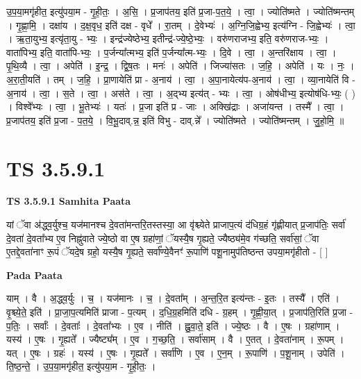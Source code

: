 \documentclass[17pt]{extarticle}
\begin{document}
उ॒प॒या॒मगृ॑हीत॒ इत्यु॑पया॒म - गृ॒ही॒तः॒ । अ॒सि॒ । प्र॒जाप॑तय॒ इति॑ प्र॒जा-प॒त॒ये॒ । त्वा॒ । ज्योति॑ष्मते । ज्योति॑ष्मन्तम् । गृ॒ह्णा॒मि॒ । दक्षा॑य । द॒क्ष॒वृध॒ इति॑ दक्ष - वृधे᳚ । रा॒तम् । दे॒वेभ्यः॑ । अ॒ग्नि॒जि॒ह्वेभ्य॒ इत्य॑ग्नि - जि॒ह्वेभ्यः॑ । त्वा॒ । ऋ॒ता॒युभ्य॒ इत्यृ॑ता॒यु - भ्यः॒ । इन्द्र॑ज्येष्ठेभ्य॒ इतीन्द्र॑-ज्ये॒ष्ठे॒भ्यः॒ । वरु॑णराजभ्य॒ इति॒ वरु॑णराज-भ्यः॒ । वाता॑पिभ्य॒ इति॒ वाता॑पि-भ्यः॒ । प॒र्जन्या᳚त्मभ्य॒ इति॑ प॒र्जन्या᳚त्म-भ्यः॒ । दि॒वे । त्वा॒ । अ॒न्तरि॑क्षाय । त्वा॒ । पृ॒थि॒व्यै । त्वा॒ । अपेति॑ । इ॒न्द्र॒ । द्वि॒ष॒तः । मनः॑ । अपेति॑ । जिज्या॑सतः । ज॒हि॒ । अपेति॑ । यः । नः॒ । अ॒रा॒ती॒यति॑ । तम् । ज॒हि॒ । प्रा॒णायेति॑ प्रा - अ॒नाय॑ । त्वा॒ । अ॒पा॒नायेत्य॑प-अ॒नाय॑ । त्वा॒ । व्या॒नायेति॑ वि - अ॒नाय॑ । त्वा॒ । स॒ते । त्वा॒ । अस॑ते । त्वा॒ । अ॒द्भ्य इत्य॑त् - भ्यः । त्वा॒ । ओष॑धीभ्य॒ इत्योष॑धि-भ्यः॒ ( ) । विश्वे᳚भ्यः । त्वा॒ । भू॒तेभ्यः॑ । यतः॑ । प्र॒जा इति॑ प्र - जाः । अक्खि॑द्राः । अजा॑यन्त । तस्मै᳚ । त्वा॒ । प्र॒जाप॑तय॒ इति॑ प्र॒जा - प॒त॒ये॒ । वि॒भू॒दाव्.न्न॒ इति॑ विभु - दाव्.न्ने᳚ । ज्योति॑ष्मते । ज्योति॑ष्मन्तम् । जु॒हो॒मि॒ ॥  \newline





\section{ TS 3.5.9.1 }

\textbf{TS 3.5.9.1 } \newline
\textbf{Samhita Paata} \newline

यां ॅवा अ॑द्ध्व॒र्युश्च॒ यज॑मानश्च दे॒वता॑मन्तरि॒तस्तस्या॒ आ वृ॑श्च्येते प्राजाप॒त्यं द॑धिग्र॒हं गृ॑ह्णीयात् प्र॒जाप॑तिः॒ सर्वा॑ दे॒वता॑ दे॒वता᳚भ्य ए॒व निह्नु॑वाते ज्ये॒ष्ठो वा ए॒ष ग्रहा॑णां॒ ॅयस्यै॒ष गृ॒ह्यते॒ ज्यैष्ठ्य॑मे॒व ग॑च्छति॒ सर्वा॑सां॒ ॅवा ए॒तद्दे॒वता॑नाꣳ रू॒पं ॅयदे॒ष ग्रहो॒ यस्यै॒ष गृ॒ह्यते॒ सर्वा᳚ण्ये॒वैनꣳ॑ रू॒पाणि॑ पशू॒नामुप॑तिष्ठन्त उपया॒मगृ॑हीतो - [  ] \newline

\textbf{Pada Paata} \newline

याम् । वै । अ॒द्ध्व॒र्युः । च॒ । यज॑मानः । च॒ । दे॒वता᳚म् । अ॒न्त॒रि॒त इत्य॑न्तः - इ॒तः । तस्यै᳚ । एति॑ । वृ॒श्च्ये॒ते॒ इति॑ । प्रा॒जा॒प॒त्यमिति॑ प्राजा - प॒त्यम् । द॒धि॒ग्र॒हमिति॑ दधि - ग्र॒हम् । गृ॒ह्णी॒या॒त् । प्र॒जाप॑ति॒रिति॑ प्र॒जा - प॒तिः॒ । सर्वाः᳚ । दे॒वताः᳚ । दे॒वता᳚भ्यः । ए॒व । नीति॑ । ह्नु॒वा॒ते॒ इति॑ । ज्ये॒ष्ठः । वै । ए॒षः । ग्रहा॑णाम् । यस्य॑ । ए॒षः । गृ॒ह्यते᳚ । ज्यैष्ट्य᳚म् । ए॒व । ग॒च्छ॒ति॒ । सर्वा॑साम् । वै । ए॒तत् । दे॒वता॑नाम् । रू॒पम् । यत् । ए॒षः । ग्रहः॑ । यस्य॑ । ए॒षः । गृ॒ह्यते᳚ । सर्वा॑णि । ए॒व । ए॒न॒म् । रू॒पाणि॑ । प॒शू॒नाम् । उपेति॑ । ति॒ष्ठ॒न्ते॒ । उ॒प॒या॒मगृ॑हीत॒ इत्यु॑पया॒म - गृ॒ही॒तः॒ ।  \newline
\end{document}
